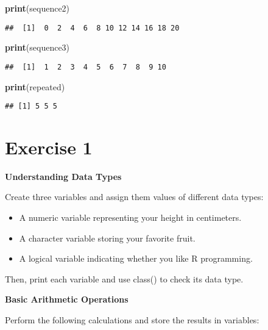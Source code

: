 \documentclass[
]{book}
\newenvironment{Shaded}{\begin{snugshade}}{\end{snugshade}}
\newcommand{\FunctionTok}[1]{\textcolor[rgb]{0.13,0.29,0.53}{\textbf{#1}}}
\newcommand{\NormalTok}[1]{#1}
\providecommand{\tightlist}{%
  \setlength{\itemsep}{0pt}\setlength{\parskip}{0pt}}
\begin{document}
\begin{Shaded}
\begin{Highlighting}[]
\FunctionTok{print}\NormalTok{(sequence2)}
\end{Highlighting}
\end{Shaded}

\begin{verbatim}
##  [1]  0  2  4  6  8 10 12 14 16 18 20
\end{verbatim}

\begin{Shaded}
\begin{Highlighting}[]
\FunctionTok{print}\NormalTok{(sequence3)}
\end{Highlighting}
\end{Shaded}

\begin{verbatim}
##  [1]  1  2  3  4  5  6  7  8  9 10
\end{verbatim}

\begin{Shaded}
\begin{Highlighting}[]
\FunctionTok{print}\NormalTok{(repeated)}
\end{Highlighting}
\end{Shaded}

\begin{verbatim}
## [1] 5 5 5
\end{verbatim}

\section{Exercise 1}\label{exercise-1}

\textbf{Understanding Data Types}

Create three variables and assign them values of different data types:

\begin{itemize}
\tightlist
\item
  A numeric variable representing your height in centimeters.
\item
  A character variable storing your favorite fruit.
\item
  A logical variable indicating whether you like R programming.
\end{itemize}

Then, print each variable and use class() to check its data type.

\textbf{Basic Arithmetic Operations}

Perform the following calculations and store the results in variables:
\end{document}
